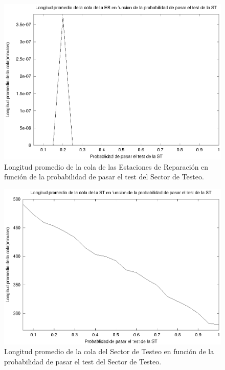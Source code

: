 \documentclass[a4paper,10pt]{article}
\begin{document}
\begin{figure}[ht]
\begin{center}
\includegraphics[width=15cm]{./img/ql_ER.eps}
\caption{\label{fig:ql_ER} Longitud promedio de la cola de las Estaciones de Reparaci\'on en funci\'on de la probabilidad de pasar el test del Sector de Testeo.}
\end{center}
\end{figure}

\begin{figure}[ht]
\begin{center}
\includegraphics[width=15cm]{./img/ql_ST.eps}
\caption{\label{fig:ql_ST} Longitud promedio de la cola del Sector de Testeo en funci\'on de la probabilidad de pasar el test del Sector de Testeo.}
\end{center}
\end{figure}
\end{document}
